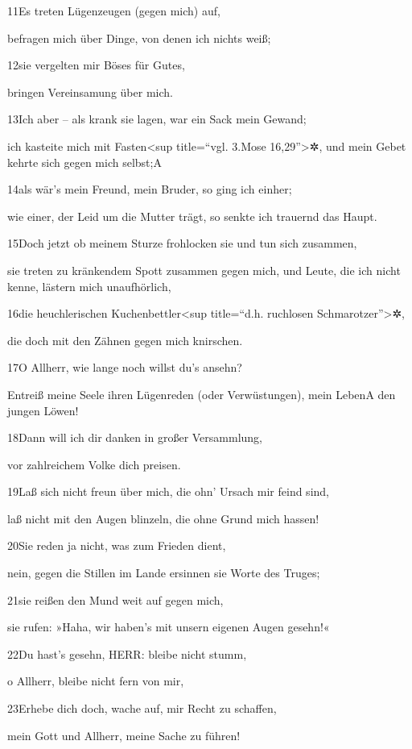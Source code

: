 11Es treten Lügenzeugen (gegen mich) auf,

befragen mich über Dinge, von denen ich nichts weiß;

12sie vergelten mir Böses für Gutes,

bringen Vereinsamung über mich.

13Ich aber -- als krank sie lagen, war ein Sack mein Gewand;

ich kasteite mich mit Fasten\textless sup title=``vgl. 3.Mose
16,29''\textgreater✲, und mein Gebet kehrte sich gegen mich selbst;{A}

14als wär's mein Freund, mein Bruder, so ging ich einher;

wie einer, der Leid um die Mutter trägt, so senkte ich trauernd das
Haupt.

15Doch jetzt ob meinem Sturze frohlocken sie und tun sich zusammen,

sie treten zu kränkendem Spott zusammen gegen mich, und Leute, die ich
nicht kenne, lästern mich unaufhörlich,

16die heuchlerischen Kuchenbettler\textless sup title=``d.h. ruchlosen
Schmarotzer''\textgreater✲,

die doch mit den Zähnen gegen mich knirschen.

17O Allherr, wie lange noch willst du's ansehn?

Entreiß meine Seele ihren Lügenreden (oder Verwüstungen), mein Leben{A}
den jungen Löwen!

18Dann will ich dir danken in großer Versammlung,

vor zahlreichem Volke dich preisen.

19Laß sich nicht freun über mich, die ohn' Ursach mir feind sind,

laß nicht mit den Augen blinzeln, die ohne Grund mich hassen!

20Sie reden ja nicht, was zum Frieden dient,

nein, gegen die Stillen im Lande ersinnen sie Worte des Truges;

21sie reißen den Mund weit auf gegen mich,

sie rufen: »Haha, wir haben's mit unsern eigenen Augen gesehn!«

22Du hast's gesehn, HERR: bleibe nicht stumm,

o Allherr, bleibe nicht fern von mir,

23Erhebe dich doch, wache auf, mir Recht zu schaffen,

mein Gott und Allherr, meine Sache zu führen!

